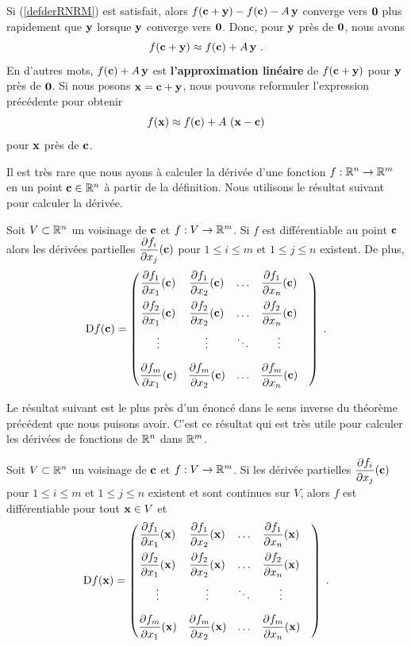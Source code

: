 {Si (\ref{defderRNRM}) est satisfait, alors
$f(\mathbf{c}+\mathbf{y})-f(\mathbf{c})- A\,\mathbf{y}$ converge vers $\mathbf{0}$
plus rapidement que $\mathbf{y}$ lorsque $\mathbf{y}$ converge vers
$\mathbf{0}$.  Donc, pour $\mathbf{y}$ près de $\mathbf{0}$, nous avons
\[
  f(\mathbf{c}+\mathbf{y})\approx f(\mathbf{c}) + A\,\mathbf{y} \ .
\]
En d'autres mots, $f(\mathbf{c}) + A\,\mathbf{y}$ est
{\bfseries l'approximation linéaire} de
$f(\mathbf{c}+\mathbf{y})$ pour $\mathbf{y}$ près de $\mathbf{0}$.  Si nous posons
$\mathbf{x} = \mathbf{c} + \mathbf{y}$, nous pouvons reformuler l'expression
précédente pour obtenir
\[
  f(\mathbf{x})\approx f(\mathbf{c}) + A\,\left(\mathbf{x} - \mathbf{c}\right)
\]
pour $\mathbf{x}$ près de $\mathbf{c}$.

Il est très rare que nous ayons à calculer la dérivée d'une fonction
$f:\mathbb{R}^n\rightarrow \mathbb{R}^m$ en un point $\mathbf{c}\in \mathbb{R}^n$ à partir de la
définition.  Nous utilisons le résultat suivant pour calculer la dérivée.

\begin{theorem}
Soit $V\subset \mathbb{R}^n$ un voisinage de $\mathbf{c}$ et $f:V\rightarrow \mathbb{R}^m$.
Si $f$ est différentiable au point $\mathbf{c}$ alors les dérivées partielles
$\displaystyle \frac{\partial f_i}{\partial x_j}(\mathbf{c})$ pour $1\leq i \leq m$ et
$1\leq j \leq n$ existent.  De plus,
\[
\mathrm{D} f(\mathbf{c}) =
\begin{pmatrix}
\displaystyle \frac{\partial f_1}{\partial x_1}(\mathbf{c}) &
\displaystyle \frac{\partial f_1}{\partial x_2}(\mathbf{c}) & \ldots &
\displaystyle \frac{\partial f_1}{\partial x_n}(\mathbf{c}) \\[1em]
\displaystyle \frac{\partial f_2}{\partial x_1}(\mathbf{c}) &
\displaystyle \frac{\partial f_2}{\partial x_2}(\mathbf{c}) & \ldots &
\displaystyle \frac{\partial f_2}{\partial x_n}(\mathbf{c}) \\[1em]
\vdots & \vdots & \ddots & \vdots & \\[1em]
\displaystyle \frac{\partial f_m}{\partial x_1}(\mathbf{c}) &
\displaystyle \frac{\partial f_m}{\partial x_2}(\mathbf{c}) & \ldots &
\displaystyle \frac{\partial f_m}{\partial x_n}(\mathbf{c})
\end{pmatrix} \; .
\]
\end{theorem}

Le résultat suivant est le plus près d'un énoncé dans le sens inverse
du théorème précédent que nous puisons avoir.  C'est ce résultat qui
est très utile pour calculer les dérivées de fonctions de $\mathbb{R}^n$ dans
$\mathbb{R}^m$.

\begin{prop}
Soit $V\subset \mathbb{R}^n$ un voisinage de $\mathbf{c}$ et $f:V\rightarrow \mathbb{R}^m$.
Si les dérivée partielles
$\displaystyle \frac{\partial f_i}{\partial x_j}(\mathbf{c})$ pour $1\leq i \leq m$ et
$1\leq j \leq n$ existent et sont continues sur $V$, alors $f$ est
différentiable pour tout $\mathbf{x} \in V$ et
\[
\mathrm{D} f(\mathbf{x}) =
\begin{pmatrix}
\displaystyle \frac{\partial f_1}{\partial x_1}(\mathbf{x}) &
\displaystyle \frac{\partial f_1}{\partial x_2}(\mathbf{x}) & \ldots &
\displaystyle \frac{\partial f_1}{\partial x_n}(\mathbf{x}) \\[1em]
\displaystyle \frac{\partial f_2}{\partial x_1}(\mathbf{x}) &
\displaystyle \frac{\partial f_2}{\partial x_2}(\mathbf{x}) & \ldots &
\displaystyle \frac{\partial f_2}{\partial x_n}(\mathbf{x}) \\[1em]
\vdots & \vdots & \ddots & \vdots & \\[1em]
\displaystyle \frac{\partial f_m}{\partial x_1}(\mathbf{x}) &
\displaystyle \frac{\partial f_m}{\partial x_2}(\mathbf{x}) & \ldots &
\displaystyle \frac{\partial f_m}{\partial x_n}(\mathbf{x})
\end{pmatrix} \; .
\]
\end{prop}

}
